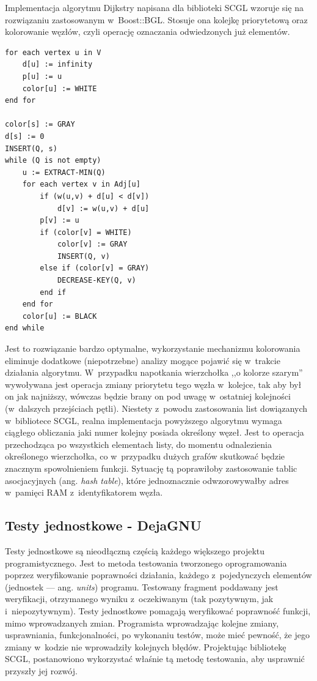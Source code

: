 \documentclass[a4paper,12pt,polish,oneside,openright]{thesis}
\begin{document}
Implementacja algorytmu Dijkstry napisana dla biblioteki SCGL wzoruje się na rozwiązaniu zastosowanym w~Boost::BGL\cite{bgl}.
Stosuje ona kolejkę priorytetową oraz kolorowanie węzłów, czyli operację oznaczania odwiedzonych już elementów.
\begin{lstlisting}[style=code,caption=Pseudokod implementowanego w SCGL algorytmu Dijkstry]
for each vertex u in V
	d[u] := infinity
	p[u] := u
	color[u] := WHITE
end for

color[s] := GRAY
d[s] := 0
INSERT(Q, s)
while (Q is not empty)
	u := EXTRACT-MIN(Q)
	for each vertex v in Adj[u]
		if (w(u,v) + d[u] < d[v])
			d[v] := w(u,v) + d[u]
		p[v] := u
		if (color[v] = WHITE)
			color[v] := GRAY
			INSERT(Q, v)
		else if (color[v] = GRAY)
			DECREASE-KEY(Q, v)
		end if
	end for
	color[u] := BLACK
end while
\end{lstlisting}
Jest to rozwiązanie bardzo optymalne, wykorzystanie mechanizmu kolorowania eliminuje dodatkowe (niepotrzebne) analizy mogące pojawić się w~trakcie działania algorytmu.
W~przypadku napotkania wierzchołka ,,o kolorze szarym'' wywoływana jest operacja zmiany priorytetu tego węzła w~kolejce, tak aby był on jak najniższy, wówczas będzie brany on pod uwagę w~ostatniej kolejności (w~dalszych przejściach pętli).
Niestety z~powodu zastosowania list dowiązanych w~bibliotece SCGL, realna implementacja powyższego algorytmu wymaga ciągłego obliczania jaki numer kolejny posiada określony węzeł.
Jest to operacja przechodząca po wszystkich elementach listy, do momentu odnalezienia określonego wierzchołka, co w~przypadku dużych grafów skutkować będzie znacznym spowolnieniem funkcji.
Sytuację tą poprawiłoby zastosowanie tablic asocjacyjnych (ang. \emph{hash table}), które jednoznacznie odwzorowywałby adres w~pamięci RAM z~identyfikatorem węzła.

\subsection{Testy jednostkowe - DejaGNU}
Testy jednostkowe są nieodłączną częścią każdego większego projektu programistycznego.
Jest to metoda testowania tworzonego oprogramowania poprzez weryfikowanie poprawności działania, każdego z~pojedynczych elementów (jednostek --- ang. \emph{units}) programu.
Testowany fragment poddawany jest weryfikacji, otrzymanego wyniku z~oczekiwanym (tak pozytywnym, jak i~niepozytywnym).
Testy jednostkowe pomagają weryfikować poprawność funkcji, mimo wprowadzanych zmian.
Programista wprowadzając kolejne zmiany, usprawniania, funkcjonalności, po wykonaniu testów, może mieć pewność, że jego zmiany w~kodzie nie wprowadziły kolejnych błędów.
Projektując bibliotekę SCGL, postanowiono wykorzystać właśnie tą metodę testowania, aby usprawnić przyszły jej rozwój.
\end{document}

